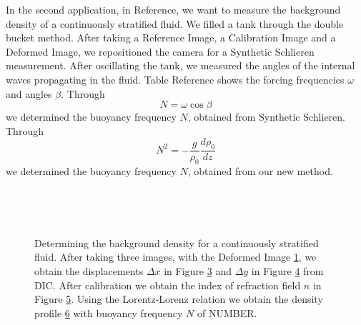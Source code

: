 \documentclass{article}
\begin{document}
In the second application, in Reference, we want to measure the background density of a continuously stratified fluid. We filled a tank through the double bucket method. After taking a Reference Image, a Calibration Image and a Deformed Image, we repositioned the camera for a Synthetic Schlieren measurement. After oscillating the tank, we measured the angles of the internal waves propagating in the fluid. Table Reference shows the forcing frequencies $\omega$ and angles $\beta$. Through
\begin{equation}
	N = \omega \cos \beta
\end{equation}
we determined the buoyancy frequency $N$, obtained from Synthetic Schlieren. Through
\begin{equation}
	N^2 = - \frac{g}{\rho_0}\frac{d \rho_0}{d z}
\end{equation}
we determined the buoyancy frequency $N$, obtained from our new method. 

\begin{figure}[htbp]
\begin{subfigure}{.5\linewidth}
		\label{fig:strat0side}
\end{subfigure}%
\begin{subfigure}{.5\linewidth}
		\label{fig:stratC0side}
\end{subfigure} \\
\begin{subfigure}{.5\linewidth}
		\label{fig:stratdx0side}
\end{subfigure}%
\begin{subfigure}{.5\linewidth}
		\label{fig:stratdy0side}
\end{subfigure}\\
\begin{subfigure}{.5\linewidth}
		\label{fig:stratndeformed0side}
\end{subfigure}%
\begin{subfigure}{.5\linewidth}
		\label{fig:stratrho0deformed0side}
\end{subfigure}
\caption{Determining the background density for a continuously stratified fluid. After taking three images, with the Deformed Image \ref{fig:strat0side}, we obtain the displacements $\Delta x$ in Figure \ref{fig:stratdx0side} and $\Delta y$ in Figure \ref{fig:stratdy0side} from DIC. After calibration we obtain the index of refraction field $n$ in Figure \ref{fig:stratndeformed0side}. Using the Lorentz-Lorenz relation we obtain the density profile \ref{fig:stratrho0deformed0side} with buoyancy frequency $N$ of NUMBER. }
\label{figs:strat0side}
\end{figure}
\end{document}
